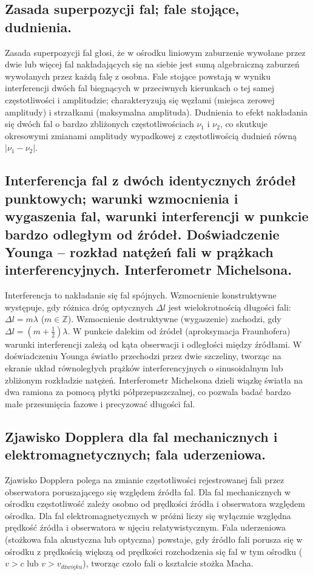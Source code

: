 \documentclass[11pt,a4paper]{article}
\begin{document}
\subsection{Zasada superpozycji fal; fale stojące, dudnienia.}
Zasada superpozycji fal głosi, że w ośrodku liniowym zaburzenie wywołane przez dwie lub więcej fal nakładających się na siebie jest sumą algebraiczną zaburzeń wywołanych przez każdą falę z osobna. Fale stojące powstają w wyniku interferencji dwóch fal biegnących w przeciwnych kierunkach o tej samej częstotliwości i amplitudzie; charakteryzują się węzłami (miejsca zerowej amplitudy) i strzałkami (maksymalna amplituda). Dudnienia to efekt nakładania się dwóch fal o bardzo zbliżonych częstotliwościach $\nu_1$ i $\nu_2$, co skutkuje okresowymi zmianami amplitudy wypadkowej z częstotliwością dudnień równą $|\nu_1 - \nu_2|$.

\subsection{Interferencja fal z dwóch identycznych źródeł punktowych; warunki wzmocnienia i wygaszenia fal, warunki interferencji w punkcie bardzo odległym od źródeł. Doświadczenie Younga -- rozkład natężeń fali w prążkach interferencyjnych. Interferometr Michelsona.}
Interferencja to nakładanie się fal spójnych. Wzmocnienie konstruktywne występuje, gdy różnica dróg optycznych $\Delta l$ jest wielokrotnością długości fali: $\Delta l = m\lambda$ ($m \in \mathbb{Z}$). Wzmocnienie destruktywne (wygaszenie) zachodzi, gdy $\Delta l = (m + \frac{1}{2})\lambda$. W punkcie dalekim od źródeł (aproksymacja Fraunhofera) warunki interferencji zależą od kąta obserwacji i odległości między źródłami. W doświadczeniu Younga światło przechodzi przez dwie szczeliny, tworząc na ekranie układ równoległych prążków interferencyjnych o sinusoidalnym lub zbliżonym rozkładzie natężeń. Interferometr Michelsona dzieli wiązkę światła na dwa ramiona za pomocą płytki półprzepuszczalnej, co pozwala badać bardzo małe przesunięcia fazowe i precyzować długości fal.

\subsection{Zjawisko Dopplera dla fal mechanicznych i elektromagnetycznych; fala uderzeniowa.}
Zjawisko Dopplera polega na zmianie częstotliwości rejestrowanej fali przez obserwatora poruszającego się względem źródła fal. Dla fal mechanicznych w ośrodku częstotliwość zależy osobno od prędkości źródła i obserwatora względem ośrodka. Dla fal elektromagnetycznych w próżni liczy się wyłącznie względna prędkość źródła i obserwatora w ujęciu relatywistycznym. Fala uderzeniowa (stożkowa fala akustyczna lub optyczna) powstaje, gdy źródło fali porusza się w ośrodku z prędkością większą od prędkości rozchodzenia się fal w tym ośrodku ($v > c$ lub $v > v_{dźwięku}$), tworząc czoło fali o kształcie stożka Macha.
\end{document}
